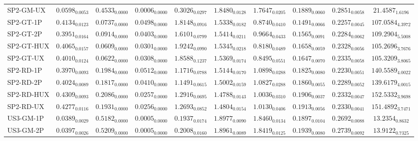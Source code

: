 \begin{longtable}{@{}lccccccccc@{}}
SP2-GM-UX & $0.0598_{0.0053}$ & $0.4533_{0.0000}$ & $0.0006_{0.0000}$ & $0.3026_{0.0297}$ & $1.8480_{0.0128}$ & $1.7647_{0.0205}$ & $0.1889_{0.0060}$ & $0.2851_{0.0058}$ & $21.4587_{1.6196}$ \\
SP2-GT-1P & $0.4134_{0.0123}$ & $0.0737_{0.0000}$ & $0.0498_{0.0000}$ & $1.8148_{0.0916}$ & $1.5338_{0.0182}$ & $0.8740_{0.0410}$ & $0.1491_{0.0066}$ & $0.2257_{0.0045}$ & $107.0584_{4.3972}$ \\
SP2-GT-2P & $0.3951_{0.0164}$ & $0.0914_{0.0000}$ & $0.0403_{0.0000}$ & $1.6101_{0.0799}$ & $1.5414_{0.0211}$ & $0.9664_{0.0433}$ & $0.1565_{0.0091}$ & $0.2284_{0.0062}$ & $109.2904_{5.5008}$ \\
SP2-GT-HUX & $0.4065_{0.0157}$ & $0.0609_{0.0000}$ & $0.0301_{0.0000}$ & $1.9242_{0.0990}$ & $1.5345_{0.0218}$ & $0.8180_{0.0489}$ & $0.1658_{0.0059}$ & $0.2328_{0.0056}$ & $105.2696_{3.7676}$ \\
SP2-GT-UX & $0.4010_{0.0124}$ & $0.0622_{0.0000}$ & $0.0308_{0.0000}$ & $1.8588_{0.1237}$ & $1.5369_{0.0174}$ & $0.8495_{0.0551}$ & $0.1647_{0.0070}$ & $0.2335_{0.0058}$ & $105.3209_{3.8065}$ \\
SP2-RD-1P & $0.3970_{0.0093}$ & $0.1984_{0.0000}$ & $0.0512_{0.0000}$ & $1.1716_{0.0788}$ & $1.5144_{0.0170}$ & $1.0898_{0.0288}$ & $0.1825_{0.0080}$ & $0.2230_{0.0051}$ & $140.5589_{4.0022}$ \\
SP2-RD-2P & $0.4024_{0.0089}$ & $0.1817_{0.0000}$ & $0.0410_{0.0000}$ & $1.1491_{0.0615}$ & $1.5002_{0.0159}$ & $1.0827_{0.0288}$ & $0.1860_{0.0055}$ & $0.2289_{0.0052}$ & $139.6179_{4.0015}$ \\
SP2-RD-HUX & $0.4309_{0.0093}$ & $0.2086_{0.0000}$ & $0.0257_{0.0000}$ & $1.2916_{0.0695}$ & $1.4788_{0.0143}$ & $1.0036_{0.0310}$ & $0.1906_{0.0037}$ & $0.2332_{0.0047}$ & $\mathbf{152.5332}_{3.9698}$ \\
SP2-RD-UX & $0.4277_{0.0116}$ & $0.1931_{0.0000}$ & $0.0256_{0.0000}$ & $1.2693_{0.0852}$ & $1.4804_{0.0154}$ & $1.0130_{0.0406}$ & $0.1913_{0.0056}$ & $0.2330_{0.0041}$ & $\mathbf{151.4892}_{3.7471}$ \\
US3-GM-1P & $0.0389_{0.0029}$ & $0.5182_{0.0000}$ & $0.0005_{0.0000}$ & $0.1937_{0.0174}$ & $1.8977_{0.0090}$ & $1.8460_{0.0134}$ & $0.1897_{0.0104}$ & $0.2692_{0.0088}$ & $13.2354_{0.8632}$ \\
US3-GM-2P & $0.0397_{0.0026}$ & $0.5209_{0.0000}$ & $0.0005_{0.0000}$ & $0.2008_{0.0160}$ & $1.8961_{0.0089}$ & $1.8419_{0.0125}$ & $0.1939_{0.0080}$ & $0.2739_{0.0092}$ & $13.9122_{0.7325}$ \\

\end{longtable}

